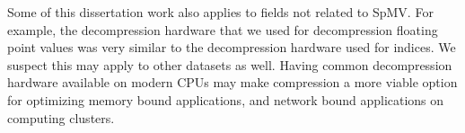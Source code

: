 Some of this dissertation work also applies to fields not related to SpMV. For example, the decompression hardware that we used for decompression floating point values was very similar to the decompression hardware used for indices. We suspect this may apply to other datasets as well. Having common decompression hardware available on modern CPUs may make compression a more viable option for optimizing memory bound applications, and network bound applications on computing clusters.
